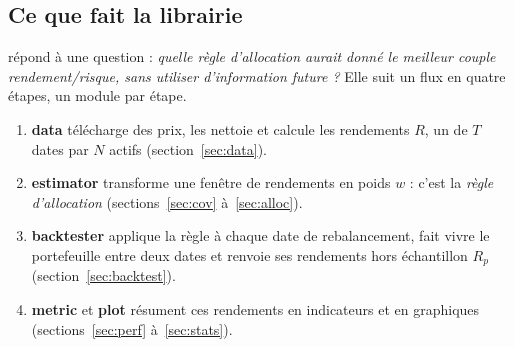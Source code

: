 \documentclass[11pt,a4paper]{article}
\theoremstyle{pdef}
\theoremstyle{pstate}
\newcommand{\py}[1]{{\ttfamily\hyphenchar\font=-1 \detokenize{#1}}}
\begin{document}
\subsection{Ce que fait la librairie}

\py{portopt} répond à une question : \emph{quelle règle d'allocation aurait donné le
meilleur couple rendement/risque, sans utiliser d'information future ?} Elle suit un
flux en quatre étapes, un module par étape.

\begin{center}
\end{center}

\begin{enumerate}
\item \textbf{data} télécharge des prix, les nettoie et calcule les rendements $R$, un
\py{DataFrame} de $T$ dates par $N$ actifs (section~\ref{sec:data}).
\item \textbf{estimator} transforme une fenêtre de rendements en poids $w$ : c'est la
\emph{règle d'allocation} (sections~\ref{sec:cov} à~\ref{sec:alloc}).
\item \textbf{backtester} applique la règle à chaque date de rebalancement, fait vivre le
portefeuille entre deux dates et renvoie ses rendements hors échantillon $R_p$
(section~\ref{sec:backtest}).
\item \textbf{metric} et \textbf{plot} résument ces rendements en indicateurs et en
graphiques (sections~\ref{sec:perf} à~\ref{sec:stats}).
\end{enumerate}
\end{document}
